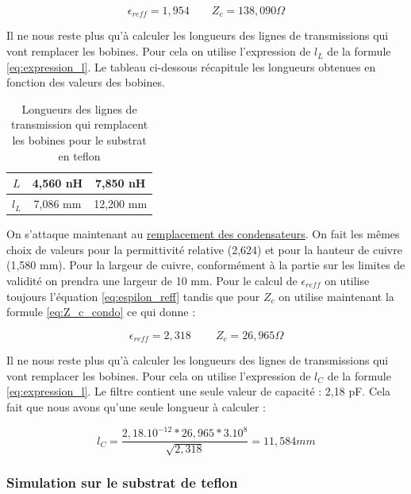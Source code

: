 \documentclass[french]{article}
\begin{document}
\begin{equation}
	\epsilon_{reff} = 1,954
	\qquad
	Z_c = 138,090 \Omega
\end{equation}

Il ne nous reste plus qu'à calculer les longueurs des lignes de transmissions qui vont remplacer les bobines. Pour cela on utilise l'expression de $l_L$ de la formule \ref{eq:expression_l}. Le tableau ci-dessous récapitule les longueurs obtenues en fonction des valeurs des bobines.


\begin{table}[H]
	\centering
	\begin{tabular}{|c|c|c|}
		\hline
		$L$ & 4,560 nH & 7,850 nH \\
		\hline
		$l_L$ & 7,086 mm & 12,200 mm\\
		\hline
	\end{tabular}
	\caption{Longueurs des lignes de transmission qui remplacent les bobines pour le substrat en teflon}
	\label{tab:longueur_ligne_bobine_passe_bas}
\end{table}


On s'attaque maintenant au \underline{remplacement des condensateurs}. On fait les mêmes choix de valeurs pour la permittivité relative (2,624) et pour la hauteur de cuivre (1,580 mm). Pour la largeur de cuivre, conformément à la partie sur les limites de validité on prendra une largeur de 10 mm. Pour le calcul de $\epsilon_{reff}$ on utilise toujours l'équation \ref{eq:espilon_reff} tandis que pour $Z_c$ on utilise maintenant la formule \ref{eq:Z_c_condo} ce qui donne :

\begin{equation}
	\epsilon_{reff} = 2,318\
	\qquad
	Z_c = 26,965 \Omega
\end{equation}

Il ne nous reste plus qu'à calculer les longueurs des lignes de transmissions qui vont remplacer les bobines. Pour cela on utilise l'expression de $l_C$ de la formule \ref{eq:expression_l}. Le filtre contient une seule valeur de capacité : 2,18 pF. Cela fait que nous avons qu'une seule longueur à calculer :

\begin{equation}
	l_C = \frac{2,18.10^{-12} * 26,965 * 3.10^8}{\sqrt{2,318}} = 11,584 mm
\end{equation}



\subsubsection{Simulation sur le substrat de teflon}
\end{document}
